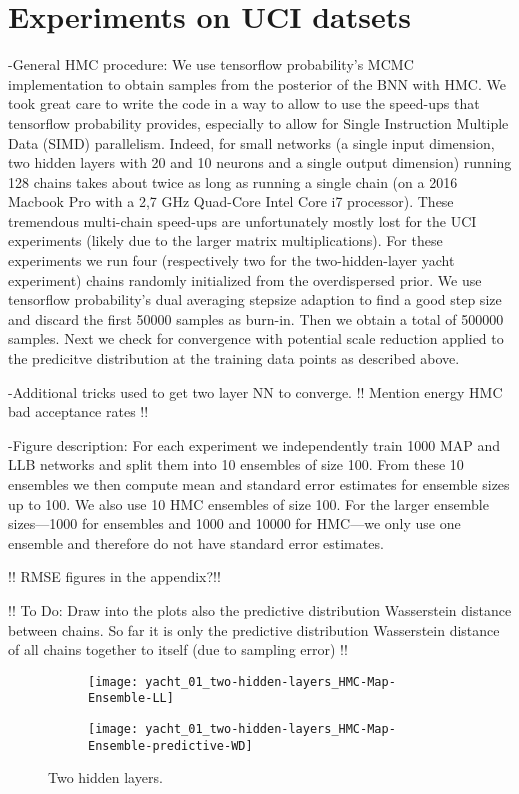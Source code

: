 \documentclass[../thesis.tex]{subfiles}
\begin{document}
\section{Experiments on UCI datsets}
-General HMC procedure:  We use tensorflow probability's MCMC implementation \parencite{lao2020tfp} to obtain samples from the posterior of the BNN with HMC. We took great care to write the code
in a way to allow to use the speed-ups that tensorflow probability provides, especially to allow for Single Instruction Multiple Data (SIMD) parallelism. Indeed, for small networks (a single input dimension, two hidden layers with 20 and 10 neurons and a single output dimension) running 128 chains takes about twice as long as running a single chain (on a 2016 Macbook Pro with a 2,7 GHz Quad-Core Intel Core i7 processor). These tremendous multi-chain speed-ups are unfortunately mostly lost for the UCI experiments (likely due to the larger matrix multiplications). For these experiments we run four (respectively two for the two-hidden-layer yacht experiment) chains randomly initialized from the overdispersed prior. We use tensorflow probability's dual averaging stepsize adaption \parencite{hoffman2014no} to find a good step size and discard the first 50000 samples as burn-in. Then we obtain a total of 500000 samples. Next we check for convergence with potential scale reduction \parencite{gelman1992inference} applied to the predicitve distribution at the training data points as described above.
\bigskip 

-Additional tricks used to get two layer NN to converge. !! Mention energy HMC bad acceptance rates !!
\bigskip

-Figure description: For each experiment we independently train 1000 MAP and LLB networks and split them into 10 ensembles of size 100. From these 10 ensembles we then compute mean and standard error estimates for ensemble sizes up to 100. We also use 10 HMC ensembles of size 100. For the larger ensemble sizes---1000 for ensembles and 1000 and 10000 for HMC---we only use one ensemble and therefore do not have standard error estimates.
\bigskip

!! RMSE figures in the appendix?!!
\bigskip

!! To Do: Draw into the plots also the predictive distribution Wasserstein distance between chains. So far it is only the predictive distribution Wasserstein distance of all chains together to itself (due to sampling error) !!
\begin{figure}
    \centering
    \begin{subfigure}{0.49\textwidth}
        \texttt{[image: yacht\_01\_two-hidden-layers\_HMC-Map-Ensemble-LL]} 
    \end{subfigure}
    \begin{subfigure}{0.49\textwidth}
        \texttt{[image: yacht\_01\_two-hidden-layers\_HMC-Map-Ensemble-predictive-WD]} 
    \end{subfigure}
    \caption{Two hidden layers.}
    \label{fig:yacht_hmc_comparison_two-hidden-layers_nll}
\end{figure}
\end{document}
